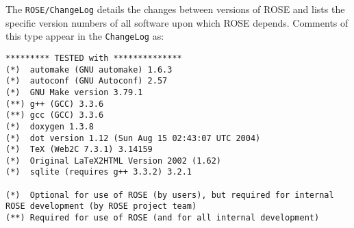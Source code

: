 The {\tt ROSE/ChangeLog} details the changes between versions of ROSE and lists the
specific version numbers of all software upon which ROSE depends. Comments of this type
appear in the {\tt ChangeLog} as:
{\footnotesize
\begin{verbatim}
********* TESTED with **************
(*)  automake (GNU automake) 1.6.3
(*)  autoconf (GNU Autoconf) 2.57
(*)  GNU Make version 3.79.1
(**) g++ (GCC) 3.3.6
(**) gcc (GCC) 3.3.6
(*)  doxygen 1.3.8
(*)  dot version 1.12 (Sun Aug 15 02:43:07 UTC 2004)
(*)  TeX (Web2C 7.3.1) 3.14159
(*)  Original LaTeX2HTML Version 2002 (1.62)
(*)  sqlite (requires g++ 3.3.2) 3.2.1

(*)  Optional for use of ROSE (by users), but required for internal ROSE development (by ROSE project team)
(**) Required for use of ROSE (and for all internal development)
\end{verbatim}
}


